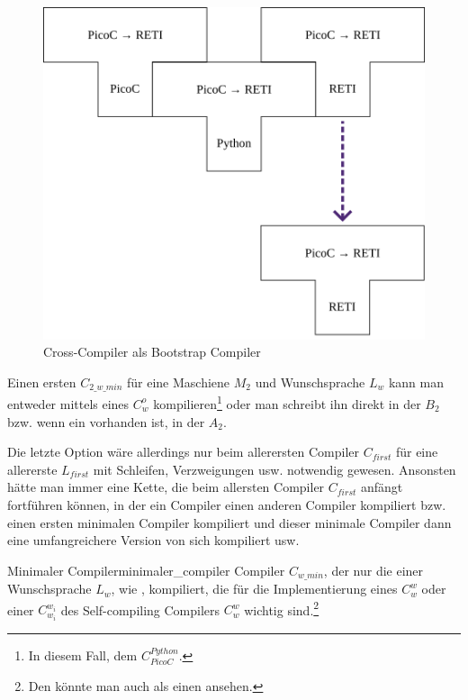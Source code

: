 \begin{figure}[H]
  \centering
  \includegraphics[width=0.5\linewidth]{./figures/cross_compiling.png}
  \caption{Cross-Compiler als Bootstrap Compiler}
\end{figure}

\begin{Special_Paragraph}
  Einen ersten  $C_{2\_w\_min}$ für eine Maschiene $M_2$ und Wunschsprache $L_w$ kann man entweder mittels eines   $C_w^o$ kompilieren\footnote{In diesem Fall, dem  $C_{PicoC}^{Python}$.} oder man schreibt ihn direkt in der  $B_2$ bzw. wenn ein  vorhanden ist, in der  $A_2$.

  Die letzte Option wäre allerdings nur beim allerersten Compiler $C_{first}$ für eine allererste  $L_{first}$ mit Schleifen, Verzweigungen usw. notwendig gewesen. Ansonsten hätte man immer eine Kette, die beim allersten Compiler $C_{first}$ anfängt fortführen können, in der ein Compiler einen anderen Compiler kompiliert bzw. einen ersten minimalen Compiler kompiliert und dieser minimale Compiler dann eine umfangreichere Version von sich kompiliert usw.
\end{Special_Paragraph}

\begin{Definition}{Minimaler Compiler}{minimaler_compiler}
  Compiler $C_{w\_min}$, der nur die  einer Wunschsprache $L_w$, wie ,   kompiliert, die für die Implementierung eines  $C_{w}^{w}$ oder einer  $C_{w_i}^{w_i}$ des Self-compiling Compilers $C_w^w$ wichtig sind.\footnote{Den  könnte man auch als einen  ansehen.}
\end{Definition}

